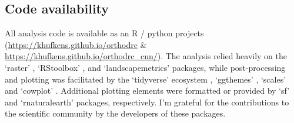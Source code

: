 \documentclass[remote sensing,article,submit,moreauthors,pdftex,10pt,a4paper]{mdpi}
\begin{document}
\hypertarget{code-availability}{%
\subsection{Code availability}\label{code-availability}}

All analysis code is available as an R / python \citep{rcoreteam2019}
projects (\url{https://khufkens.github.io/orthodrc} \&
\url{https://khufkens.github.io/orthodrc_cnn/}). The analysis relied
heavily on the `raster' \citep{hijmans2019}, `RStoolbox'
\citep{leutner2019}, and `landscapemetrics' \citep{hesselbarth2019}
packages, while post-processing and plotting was facilitated by the
`tidyverse' ecosystem \citep{wickham2017}, `ggthemes'
\citep{arnold2019}, `scales' \citep{wickham2018} and `cowplot'
\citep{wilke2019}. Additional plotting elements were formatted or
provided by `sf' \citep{pebesma2018} and `rnaturalearth'
\citep{south2017} packages, respectively. I'm grateful for the
contributions to the scientific community by the developers of these
packages.

%

\vspace{6pt}


\end{document}
